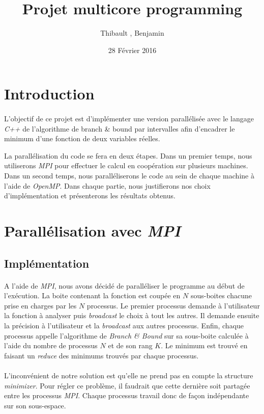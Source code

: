 \documentclass[a4paper]{article}
\title{Projet multicore programming}
\author{Thibault \bsc{Bèziers la Fosse}, Benjamin \bsc{Moreau}}
\date{28 Février 2016}
\begin{document}
\maketitle

\section{Introduction}
    \paragraph{}
    L'objectif de ce projet est d'implémenter une version parallélisée avec le langage \emph{C++} de l'algorithme de branch \& bound par intervalles afin d'encadrer le minimum d'une fonction de deux variables réelles.
    
    La parallélisation du code se fera en deux étapes. Dans un premier temps, nous utiliserons \emph{MPI} pour effectuer le calcul en coopération sur plusieurs machines. Dans un second temps, nous paralléliserons le code au sein de chaque machine à l'aide de \emph{OpenMP}. Dans chaque partie, nous justifierons nos choix d'implémentation et présenterons les résultats obtenus.
    
\section{Parallélisation avec \emph{MPI}}
    \subsection{Implémentation}
    \paragraph{}
    A l'aide de \emph{MPI}, nous avons décidé de paralléliser le programme au début de l’exécution. La boite contenant la fonction est coupée en $N$ sous-boites chacune prise en charges par les $N$ processus.
    Le premier processus demande à l'utilisateur la fonction à analyser puis \emph{broadcast} le choix à tout les autres. Il demande ensuite la précision à l'utilisateur et la \emph{broadcast} aux autres processus.
    Enfin, chaque processus appelle l'algorithme de \emph{Branch \& Bound} sur sa sous-boite calculée à l'aide du nombre de processus $N$ et de son rang $K$. Le minimum est trouvé en faisant un \emph{reduce} des minimums trouvés par chaque processus.
    
    \paragraph{}
    L’inconvénient de notre solution est qu'elle ne prend pas en compte la structure \emph{minimizer}. Pour régler ce problème, il faudrait que cette dernière soit partagée entre les processus \emph{MPI}. Chaque processus travail donc de façon indépendante sur son sous-espace.
\end{document}
